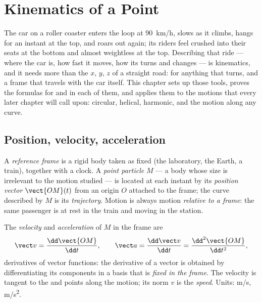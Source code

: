 \chapter{Kinematics of a Point}\label{ch:b1:point-kinematics}

The car on a roller coaster enters the loop at \qty{90}{km/h}, slows
as it climbs, hangs for an instant at the top, and roars out again;
its riders feel crushed into their seats at the bottom and almost
weightless at the top. Describing that ride --- where the car is, how
fast it moves, how its  turns and changes --- is kinematics,
and it needs more than the $x$, $y$, $z$ of a straight road:  for anything that turns, and a frame that travels with the
car itself. This chapter sets up those tools, proves the formulas for
 and  in each of them, and applies them to the
motions that every later chapter will call upon: circular, helical,
harmonic, and the motion along any curve.

\section{Position, velocity, acceleration}

\begin{definition}\label{def:b1:point-kinematics:frame}
A \emph{reference frame} is a rigid body taken as fixed (the
laboratory, the Earth, a train), together with a clock. A \emph{point
particle} $M$ --- a body whose size is irrelevant to the motion studied
--- is located at each instant by its \emph{position vector}
$\vect{OM}(t)$ from an origin $O$ attached to the frame; the curve
described by $M$ is its \emph{trajectory}. Motion is always motion
\emph{relative to a frame}: the same passenger is at rest in the train
and moving in the station.
\end{definition}

\begin{definition}\label{def:b1:point-kinematics:velocity}
The \emph{velocity} and \emph{acceleration} of $M$ in the frame are
\[
\vect v = \frac{\dd\vect{OM}}{\dd t}, \qquad
\vect a = \frac{\dd\vect v}{\dd t} = \frac{\dd^2\vect{OM}}{\dd t^2},
\]
derivatives of vector functions: the derivative of a vector is
obtained by differentiating its components in a basis that is
\emph{fixed in the frame}. The velocity is tangent to the 
and points along the motion; its norm $v$ is the \emph{speed}. Units:
\unit{m/s}, \unit{m/s^2}.
\end{definition}


